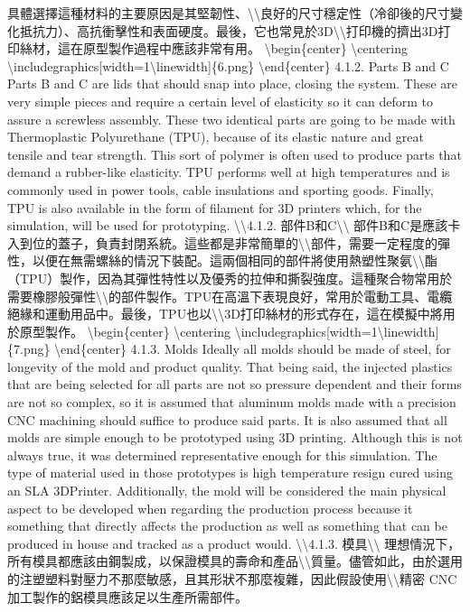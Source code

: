 具體選擇這種材料的主要原因是其堅韌性、\textbackslash\textbackslash 良好的尺寸穩定性（冷卻後的尺寸變化抵抗力）、高抗衝擊性和表面硬度。最後，它也常見於3D\textbackslash\textbackslash 打印機的擠出3D打印絲材，這在原型製作過程中應該非常有用。
\textbackslash begin\{center\} \textbackslash centering
\textbackslash includegraphics{[}width=1\textbackslash linewidth{]}\{6.png\}
\textbackslash end\{center\} 4.1.2. Parts B and C Parts B and C are lids
that should snap into place, closing the system. These are very simple
pieces and require a certain level of elasticity so it can deform to
assure a screwless assembly. These two identical parts are going to be
made with Thermoplastic Polyurethane (TPU), because of its elastic
nature and great tensile and tear strength. This sort of polymer is
often used to produce parts that demand a rubber-like elasticity. TPU
performs well at high temperatures and is commonly used in power tools,
cable insulations and sporting goods. Finally, TPU is also available in
the form of filament for 3D printers which, for the simulation, will be
used for prototyping. \textbackslash\textbackslash4.1.2.
部件B和C\textbackslash\textbackslash{}
部件B和C是應該卡入到位的蓋子，負責封閉系統。這些都是非常簡單的\textbackslash\textbackslash 部件，需要一定程度的彈性，以便在無需螺絲的情況下裝配。這兩個相同的部件將使用熱塑性聚氨\textbackslash\textbackslash 酯（TPU）製作，因為其彈性特性以及優秀的拉伸和撕裂強度。這種聚合物常用於需要橡膠般彈性\textbackslash\textbackslash 的部件製作。TPU在高溫下表現良好，常用於電動工具、電纜絕緣和運動用品中。最後，TPU也以\textbackslash\textbackslash3D打印絲材的形式存在，這在模擬中將用於原型製作。
\textbackslash begin\{center\} \textbackslash centering
\textbackslash includegraphics{[}width=1\textbackslash linewidth{]}\{7.png\}
\textbackslash end\{center\} 4.1.3. Molds Ideally all molds should be
made of steel, for longevity of the mold and product quality. That being
said, the injected plastics that are being selected for all parts are
not so pressure dependent and their forms are not so complex, so it is
assumed that aluminum molds made with a precision CNC machining should
suffice to produce said parts. It is also assumed that all molds are
simple enough to be prototyped using 3D printing. Although this is not
always true, it was determined representative enough for this
simulation. The type of material used in those prototypes is high
temperature resign cured using an SLA 3DPrinter. Additionally, the mold
will be considered the main physical aspect to be developed when
regarding the production process because it something that directly
affects the production as well as something that can be produced in
house and tracked as a product would. \textbackslash\textbackslash4.1.3.
模具\textbackslash\textbackslash{}
理想情況下，所有模具都應該由鋼製成，以保證模具的壽命和產品\textbackslash\textbackslash 質量。儘管如此，由於選用的注塑塑料對壓力不那麼敏感，且其形狀不那麼複雜，因此假設使用\textbackslash\textbackslash 精密
CNC 加工製作的鋁模具應該足以生產所需部件。

